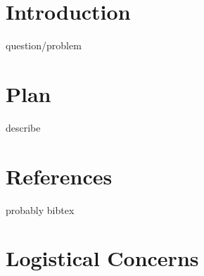 \documentclass[12pt]{article}
\begin{document}
\maketitle

\section{Introduction}

question/problem

\section{Plan}

describe

\section{References}

probably bibtex

\section{Logistical Concerns}
\end{document}
